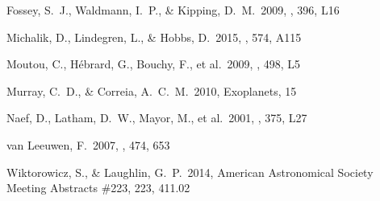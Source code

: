 \documentclass[12pt]{article}
\begin{document}
 
 

\begin{thebibliography}{}

 Fossey, S.~J., Waldmann, I.~P., \& Kipping, D.~M.\ 2009, \mnras, 396, L16 

 Michalik, D., Lindegren, L., \& Hobbs, D.\ 2015, \aap, 574, A115 

 Moutou, C., H{\'e}brard, G., Bouchy, F., et al.\ 2009, \aap, 498, L5 

 Murray, C.~D., \& Correia, A.~C.~M.\ 2010, Exoplanets, 15 

 Naef, D., Latham, D.~W., Mayor, M., et al.\ 2001, \aap, 375, L27 

 van Leeuwen, F.\ 2007, \aap, 474, 653 

 Wiktorowicz, S., \& Laughlin, G.~P.\ 2014, American Astronomical Society Meeting Abstracts \#223, 223, 411.02 


\end{thebibliography}
\end{document}
